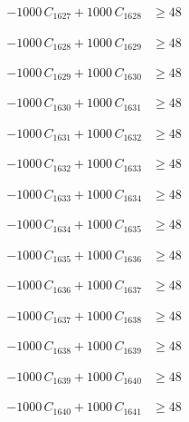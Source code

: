 \documentclass[a4paper,11pt]{article}
\begin{document}
\begin{align}
-1000\,C_{1627} + 1000\,C_{1628} &\geq 48 \nonumber
\end{align}

\begin{align}
-1000\,C_{1628} + 1000\,C_{1629} &\geq 48 \nonumber
\end{align}

\begin{align}
-1000\,C_{1629} + 1000\,C_{1630} &\geq 48 \nonumber
\end{align}

\begin{align}
-1000\,C_{1630} + 1000\,C_{1631} &\geq 48 \nonumber
\end{align}

\begin{align}
-1000\,C_{1631} + 1000\,C_{1632} &\geq 48 \nonumber
\end{align}

\begin{align}
-1000\,C_{1632} + 1000\,C_{1633} &\geq 48 \nonumber
\end{align}

\begin{align}
-1000\,C_{1633} + 1000\,C_{1634} &\geq 48 \nonumber
\end{align}

\begin{align}
-1000\,C_{1634} + 1000\,C_{1635} &\geq 48 \nonumber
\end{align}

\begin{align}
-1000\,C_{1635} + 1000\,C_{1636} &\geq 48 \nonumber
\end{align}

\begin{align}
-1000\,C_{1636} + 1000\,C_{1637} &\geq 48 \nonumber
\end{align}

\begin{align}
-1000\,C_{1637} + 1000\,C_{1638} &\geq 48 \nonumber
\end{align}

\begin{align}
-1000\,C_{1638} + 1000\,C_{1639} &\geq 48 \nonumber
\end{align}

\begin{align}
-1000\,C_{1639} + 1000\,C_{1640} &\geq 48 \nonumber
\end{align}

\begin{align}
-1000\,C_{1640} + 1000\,C_{1641} &\geq 48 \nonumber
\end{align}
\end{document}
